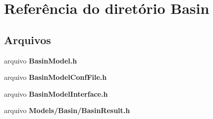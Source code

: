 \section{Referência do diretório Basin}
\label{dir_03447715b330945c4d84cb7ecd7b7d63}
\subsection*{Arquivos}
\begin{DoxyCompactItemize}
\item 
arquivo {\bf Basin\+Model.\+h}
\item 
arquivo {\bf Basin\+Model\+Conf\+File.\+h}
\item 
arquivo {\bf Basin\+Model\+Interface.\+h}
\item 
arquivo {\bf Models/\+Basin/\+Basin\+Result.\+h}
\end{DoxyCompactItemize}

